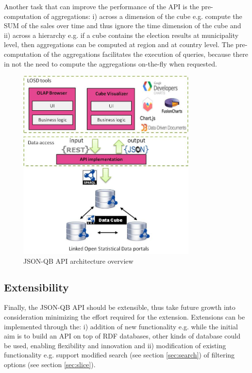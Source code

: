 \documentclass{llncs}
\begin{document}
Another task that can improve the performance of the API is the pre-computation of aggregations: i) across a dimension of the cube e.g. compute the SUM of the sales over time and thus ignore the time dimension of the cube and ii) across a hierarchy e.g. if a cube contains the election results at municipality level, then aggregations can be computed at region and at country level. The pre-computation of the aggregations facilitates the execution of queries, because there in not the need to compute the aggregations on-the-fly when requested. 

\begin{figure}[h!]
\begin{center}
  \includegraphics[width=90mm]{images/overview.jpg}
\caption{JSON-QB API architecture overview}
\label{fig:overview}
\end{center}
\end{figure}

\subsection{Extensibility}

Finally, the JSON-QB API should be extensible, thus take future growth into consideration minimizing the effort required for the extension. Extensions can be implemented through the: i) addition of new functionality e.g. while the initial aim is to build an API on top of RDF databases, other kinds of database could be used, enabling flexibility and innovation and ii) modification of existing functionality e.g. support modified search (see section \ref{sec:search}) of filtering options (see section \ref{sec:slice}).
\end{document}
